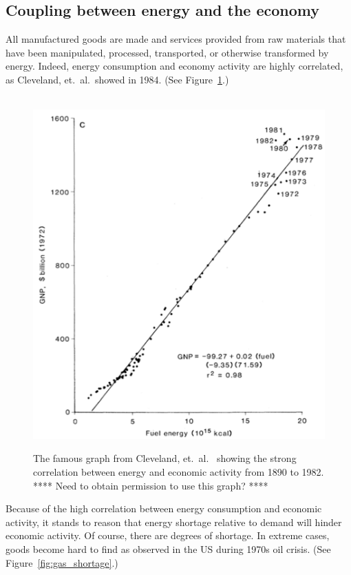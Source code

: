 \subsection{Coupling between energy and the economy}
\label{sec:energy-economy_coupling}

All manufactured goods are made and services provided
from raw materials that have been
manipulated, processed, transported, or otherwise transformed by energy.
Indeed, energy consumption and economy activity are highly correlated,
as Cleveland, et.\ al.\ showed in 1984. 
(See Figure~\ref{fig:Cleveland1984}.)

\begin{figure}[!ht]
\centering\
\includegraphics[width=\linewidth]{Part_0/Chapter_Introduction/images/Cleveland1984.pdf}
\caption[Energy and economic activity]{The famous graph from Cleveland, et.\ al.\
\cite{Cleveland:1984aa} showing the strong correlation 
between energy and economic activity from 1890 to 1982.
**** Need to obtain permission to use this graph? ****}
\label{fig:Cleveland1984}
\end{figure}

Because of the high correlation between energy consumption and economic activity,
it stands to reason that energy shortage relative to demand will hinder economic activity.
Of course, there are degrees of shortage. 
In extreme cases, goods become hard to find 
as observed in the US during 1970s oil crisis.
(See Figure~\ref{fig:gas_shortage}.)


